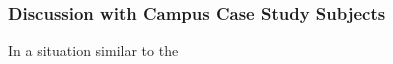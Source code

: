 \subsubsection{Discussion with Campus Case Study Subjects}
\label{sec:performanceclass_oncasestudy}

In a situation similar to the 